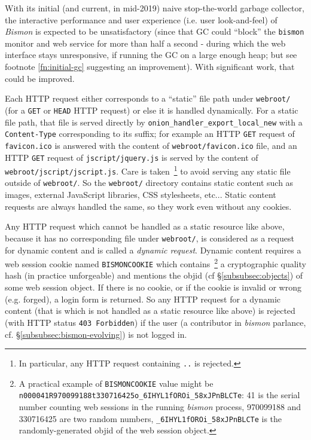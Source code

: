 With its initial (and current, in mid-2019) naive stop-the-world
garbage collector, the interactive performance and user experience
(i.e. user look-and-feel) of \emph{Bismon} is expected to be
unsatisfactory (since that GC could ``block'' the \texttt{bismon}
monitor and web service for more than half a second - during which the
web interface stays unresponsive, if running the GC on a large enough
heap; but see footnote \ref{fn:initial-gc} suggesting an
improvement). With significant work, that could be improved.

Each HTTP request   either
corresponds to a ``static'' file path under \texttt{webroot/} (for a
\texttt{GET} or \texttt{HEAD} HTTP request) or else it is handled
dynamically. For a static file path, that file is served directly by
\texttt{onion\_handler\_export\_local\_new} with a
\texttt{Content-Type} corresponding to its suffix; for example an HTTP
\texttt{GET} request of \texttt{favicon.ico} is answered with the
content of \texttt{webroot/favicon.ico} file, and an HTTP \texttt{GET}
request of \texttt{jscript/jquery.js} is served by the content of
\texttt{webroot/jscript/jscript.js}. Care is taken~\footnote{In
  particular, any HTTP request containing \texttt{..} is rejected.} to
avoid serving any static file outside of \texttt{webroot/}. So the
\texttt{webroot/} directory contains static content such as images,
external JavaScript libraries, CSS stylesheets, etc... Static content
requests are always handled the same, so they work even without any
cookies.  

Any HTTP request which cannot be handled as a static resource like
above, because it has no corresponding file under \texttt{webroot/},
is considered as a request for dynamic content and is called a
  \emph{dynamic
  request}. Dynamic content requires a web session 
 cookie  
named \texttt{BISMONCOOKIE} which contains~\footnote{A practical
  example of \texttt{BISMONCOOKIE} value might be
  \texttt{n000041R970099188t330716425o\_6IHYL1fOROi\_58xJPnBLCTe}: 41
  is the serial number counting web sessions in the running
  \emph{bismon} process, 970099188 and 330716425 are two random
  numbers, \texttt{\_6IHYL1fOROi\_58xJPnBLCTe} is the
  randomly-generated objid of the web session object.} a cryptographic
quality hash (in practice unforgeable) and mentions the objid
 (cf §\ref{subsubsec:objects}) of some web session
object. If there is no cookie, or if the  cookie is
invalid or wrong (e.g. forged), a login  form is
returned. So any HTTP request for a dynamic content (that is which is
not handled as a static resource like above) is rejected (with HTTP
status \texttt{403 Forbidden}) if the user (a 
contributor in \emph{bismon} parlance,
cf. §\ref{subsubsec:bismon-evolving}) is not logged in.

